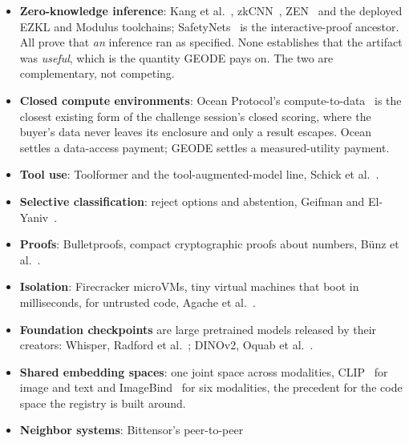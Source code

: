 \documentclass[11pt]{article}
\begin{document}
\begin{itemize}
          conferrable adversarial examples, Lukas et al.~\cite{lukas2021};
          Proof-of-Learning, Jia et al.~\cite{pol2021}. The fingerprint of
          Section~\ref{sec:proofs} is a fingerprint in exactly their sense.
          We use it to bind economic identity, not to prove ownership in a
          court.
    \item \textbf{Zero-knowledge inference}: Kang et
          al.~\cite{kang2022}, zkCNN~\cite{zkcnn2021}, ZEN~\cite{zen2021}
          and the deployed EZKL and Modulus toolchains;
          SafetyNets~\cite{safetynets2017} is the interactive-proof
          ancestor. All prove
          that \emph{an} inference ran as specified. None establishes that
          the artifact was \emph{useful}, which is the quantity GEODE
          pays on. The two are complementary, not competing.
    \item \textbf{Closed compute environments}: Ocean Protocol's
          compute-to-data~\cite{ocean2019} is the closest existing form of
          the challenge session's closed scoring, where the buyer's data never
          leaves its enclosure and only a result escapes. Ocean settles a
          data-access payment; GEODE settles a measured-utility payment.
    \item \textbf{Tool use}: Toolformer and the tool-augmented-model
          line, Schick et al.~\cite{schick2023}.
    \item \textbf{Selective classification}: reject options and
          abstention, Geifman and El-Yaniv~\cite{geifman2017}.
    \item \textbf{Proofs}: Bulletproofs, compact cryptographic proofs
          about numbers, B\"unz et al.~\cite{bunz2018}.
    \item \textbf{Isolation}: Firecracker microVMs, tiny virtual
          machines that boot in milliseconds, for untrusted code,
          Agache et al.~\cite{agache2020}.
    \item \textbf{Foundation checkpoints} are large pretrained models
          released by their creators: Whisper, Radford et
          al.~\cite{radford2023}; DINOv2, Oquab et al.~\cite{oquab2024}.
    \item \textbf{Shared embedding spaces}: one joint space across
          modalities, CLIP~\cite{clip2021} for image and text and
          ImageBind~\cite{imagebind2023} for six modalities, the
          precedent for the code space the registry is built around.
    \item \textbf{Neighbor systems}: Bittensor's peer-to-peer

\end{itemize}
\end{document}
